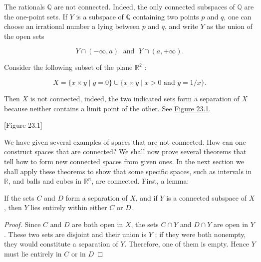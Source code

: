 \begin{centeredblock}
\begin{example}
\label{ex:\thesection.\theexample}
 The rationals \(\mathbb{Q}\) are not connected. Indeed, the only connected subspaces of \(\mathbb{Q}\) are the one-point sets. If \(Y\) is a subspace of \(\mathbb{Q}\) containing two points \(p\) and \(q\), one can choose an irrational number a lying between \(p\) and \(q\), and write \(Y\) as the union of the open sets

 \[
 Y \cap ( {-\infty, a}) \;\text{ and }\;Y \cap ( {a, + \infty }).
 \]
\end{example}
\end{centeredblock}

\begin{centeredblock}
\begin{example}
\label{ex:\thesection.\theexample}
 Consider the following subset of the plane \(\mathbb{R}^{2}\) :

 \[
 X = \{ x \times y \mid y = 0\} \cup \{ x \times y \mid x > 0\text{ and }y = 1/x\}.
 \]

Then \(X\) is not connected, indeed, the two indicated sets form a separation of \(X\) because neither contains a limit point of the other. See \hyperref[fig:23.1]{Figure 23.1}.

[Figure 23.1]
\end{example}
\end{centeredblock}

We have given several examples of spaces that are not connected. How can one construct spaces that are connected? We shall now prove several theorems that tell how to form new connected spaces from given ones. In the next section we shall apply these theorems to show that some specific spaces, such as intervals in \(\mathbb{R}\), and balls and cubes in \(\mathbb{R}^{n}\), are connected. First, a lemma:

\begin{lemma}
\label{lem:\thetheorem}
 If the sets \(C\) and \(D\) form a separation of \(X\), and if \(Y\) is a connected subspace of \(X\), then \(Y\) lies entirely within either \(C\) or \(D\).
\end{lemma}

\begin{proof}
Since \(C\) and \(D\) are both open in \(X\), the sets \(C \cap Y\) and \(D \cap Y\) are open in \(Y\). These two sets are disjoint and their union is \(Y\) ; if they were both nonempty, they would constitute a separation of \(Y\). Therefore, one of them is empty. Hence \(Y\) must lie entirely in \(C\) or in \(D\)
\end{proof}

